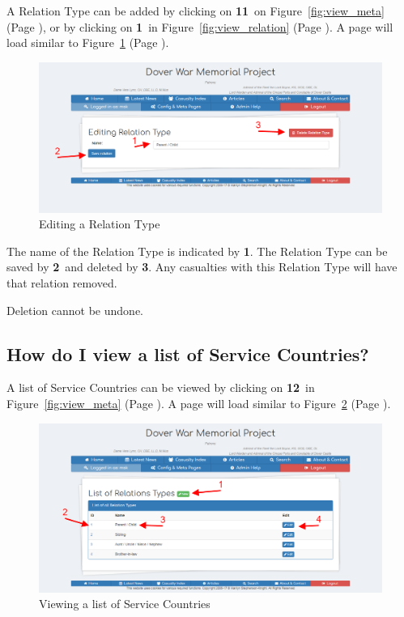 \documentclass[12pt]{article}
\newcommand{\marker}[1]{\color{red}\textbf{#1}\color{black}}
\newcommand{\myref}[1]{\ref{#1} {\scriptsize(Page \pageref{#1})}}
\begin{document}
A Relation Type can be added by clicking on \marker{11}\ on Figure~\myref{fig:view_meta}, or by clicking on \marker{1}\ in Figure~\myref{fig:view_relation}. A page will load similar to Figure~\myref{fig:edit_relation}.

\begin{figure}[h]
  \centering
 \includegraphics[width=.9\textwidth]{pics/edit_relation.png}
	\caption{Editing a Relation Type}\label{fig:edit_relation}
\end{figure}

The name of the Relation Type is indicated by \marker{1}. The Relation Type can be saved by \marker{2}\ and deleted by \marker{3}. Any casualties with this Relation Type will have that relation removed.

\begin{warningBox}
Deletion cannot be undone.
\end{warningBox} 

\newpage
\FloatBarrier
\subsection{How do I view a list of Service Countries?} \label{ssec:view_country}

A list of Service Countries can be viewed by clicking on \marker{12}\ in Figure~\myref{fig:view_meta}. A page will load similar to Figure~\myref{fig:view_country}.

\begin{figure}[h]
  \centering
 \includegraphics[width=.9\textwidth]{pics/view_relation.png}
	\caption{Viewing a list of Service Countries}\label{fig:view_country}
\end{figure}
\end{document}

